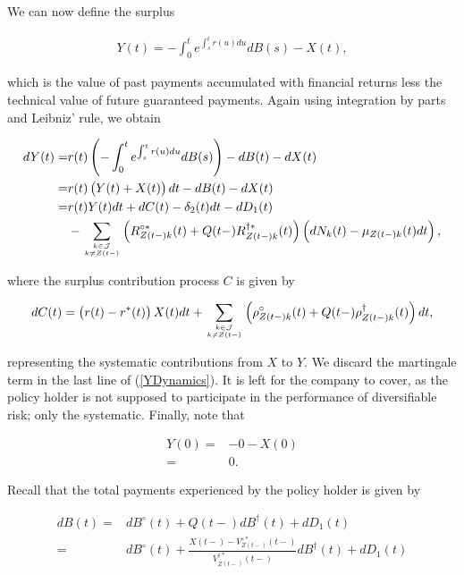 \documentclass{book}
\newcommand{\1}[1]{\mathbbm{1}_{\left\lbrace #1 \right\rbrace}}
\theoremstyle{break}
\theoremstyle{remark}
\numberwithin{equation}{section}
\begin{document}
We can now define the surplus

\begin{align*}
Y(t) = - \int_0^t e^{\int_s^t r(u)du} dB(s) - X(t),
\end{align*}

which is the value of past payments accumulated with financial returns less the technical value of future guaranteed payments. Again using integration by parts and Leibniz' rule, we obtain

\begin{align} \label{YDynamics}
\begin{split}
	dY(t) =& r(t) \left( - \int_0^t e^{\int_s^t r(u) du} dB(s) \right) - dB(t) - dX(t) \\
	=& r(t) \left( Y(t) + X(t) \right)dt - dB(t) - dX(t) \\
	=& r(t) Y(t) dt + dC(t) - \delta_2(t)dt - dD_1(t) \\
	&- \sum_{k \in \mathcal{J} \atop k \neq Z(t-)} \left( R_{Z(t-)k}^{\circ*}(t) + Q(t-) R_{Z(t-)k}^{\dagger*}(t) \right) \left( dN_k(t) - \mu_{Z(t-)k}(t) dt \right),
\end{split}
\end{align}

 where the surplus contribution process $C$ is given by

\begin{align*}
	dC(t) = \left( r(t) - r^*(t) \right) X(t) dt + \sum_{k \in \mathcal{J} \atop k \neq Z(t-)} \left( \rho_{Z(t-)k}^\circ(t) + Q(t-) \rho_{Z(t-)k}^\dagger(t) \right) dt,
\end{align*}

representing the systematic contributions from $X$ to $Y$. We discard the martingale term in the last line of (\ref{YDynamics}). It is left for the company to cover, as the policy holder is not supposed to participate in the performance of diversifiable risk; only the systematic. Finally, note that

\begin{align*}
	Y(0) =& - 0 - X(0) \\
	=& 0.
\end{align*}

Recall that the total payments experienced by the policy holder is given by

\begin{align*}
dB(t) =& dB^\circ(t) + Q(t-) dB^\dagger(t) + dD_1(t)\\
=& dB^\circ(t) + \frac{X(t-) - V_{Z(t-)}^{\circ*}(t-)}{V_{Z(t-)}^{\dagger*}(t-)} dB^\dagger(t) + dD_1(t)
\end{align*}
\end{document}
